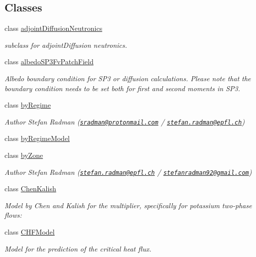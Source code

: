 \subsection*{Classes}
\begin{DoxyCompactItemize}
\item 
class \hyperlink{classFoam_1_1adjointDiffusionNeutronics}{adjoint\+Diffusion\+Neutronics}
\begin{DoxyCompactList}\small\item\em subclass for adjoint\+Diffusion neutronics. \end{DoxyCompactList}\item 
class \hyperlink{classFoam_1_1albedoSP3FvPatchField}{albedo\+S\+P3\+Fv\+Patch\+Field}
\begin{DoxyCompactList}\small\item\em Albedo boundary condition for S\+P3 or diffusion calculations. Please note that the boundary condition needs to be set both for first and second moments in S\+P3. \end{DoxyCompactList}\item 
class \hyperlink{classFoam_1_1byRegime}{by\+Regime}
\begin{DoxyCompactList}\small\item\em Author Stefan Radman (\href{mailto:sradman@protonmail.com}{\tt sradman@protonmail.\+com} / \href{mailto:stefan.radman@epfl.ch}{\tt stefan.\+radman@epfl.\+ch}) \end{DoxyCompactList}\item 
class \hyperlink{classFoam_1_1byRegimeModel}{by\+Regime\+Model}
\item 
class \hyperlink{classFoam_1_1byZone}{by\+Zone}
\begin{DoxyCompactList}\small\item\em Author Stefan Radman (\href{mailto:stefan.radman@epfl.ch}{\tt stefan.\+radman@epfl.\+ch} / \href{mailto:stefanradman92@gmail.com}{\tt stefanradman92@gmail.\+com}) \end{DoxyCompactList}\item 
class \hyperlink{classFoam_1_1ChenKalish}{Chen\+Kalish}
\begin{DoxyCompactList}\small\item\em Model by Chen and Kalish for the multiplier, specifically for potassium two-\/phase flows\+: \end{DoxyCompactList}\item 
class \hyperlink{classFoam_1_1CHFModel}{C\+H\+F\+Model}
\begin{DoxyCompactList}\small\item\em Model for the prediction of the critical heat flux. \end{DoxyCompactList}\item 

\end{DoxyCompactItemize}
